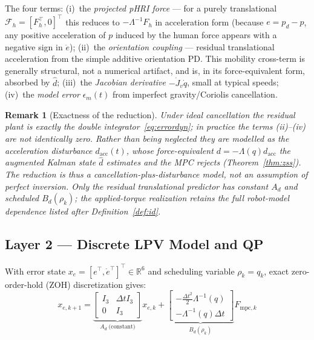\documentclass[journal]{IEEEtran}
\newtheorem{remark}{Remark}
\newcommand{\Laminv}{\Lambda^{-1}(q)}
\newcommand{\Fmpck}[1]{F_{\text{mpc},#1}}
\newcommand{\dhat}{\hat{d}}
\begin{document}
The four terms: (i)~the \emph{projected pHRI force} — for a purely
translational $\mathcal{F}_h=[F_h^\top,0]^\top$ this reduces to
$-\Lambda^{-1}F_h$ in acceleration form (because $e=p_d-p$, any positive
acceleration of $p$ induced by the human force appears with a negative sign
in $\ddot e$);
(ii)~the \emph{orientation coupling} — residual translational
acceleration from the simple additive orientation PD. This mobility
cross-term is generally structural, not a numerical artifact, and is,
in its force-equivalent form, absorbed by $\dhat$;
(iii)~the \emph{Jacobian derivative} $-\dot{J}_v\dot{q}$, small at
typical speeds; (iv)~the \emph{model error} $\epsilon_m(t)$ from
imperfect gravity/Coriolis cancellation.

\begin{remark}[Exactness of the reduction]
Under \emph{ideal} cancellation the residual plant is exactly the double
integrator~\eqref{eq:errordyn}; in practice the terms
(ii)--(iv) are not identically zero. Rather than being neglected they are
\emph{modelled} as the acceleration disturbance $d_{\text{acc}}(t)$, whose
force-equivalent $d=-\Lambda(q)d_{\text{acc}}$ the augmented Kalman state
$\dhat$ estimates and the MPC rejects (Theorem~\ref{thm:zss}). The reduction is
thus a \emph{cancellation-plus-disturbance} model, not an assumption of perfect
inversion. Only the residual translational predictor has constant $A_d$ and
scheduled $B_d(\rho_k)$; the applied-torque realization retains the full
robot-model dependence listed after Definition~\ref{def:id}.
\end{remark}

\subsection{Layer 2 --- Discrete LPV Model and QP}\label{sec:layer2}

With error state $x_e=[e^\top,\dot{e}^\top]^\top\in\mathbb{R}^6$ and
scheduling variable $\rho_k=q_k$, exact zero-order-hold (ZOH) discretization gives:
\begin{equation}\label{eq:lpv}
  x_{e,k+1} = \underbrace{\begin{bmatrix}I_3&\Delta t I_3\\0&I_3\end{bmatrix}}_{A_d\;\text{(constant)}}
              x_{e,k}
            + \underbrace{\begin{bmatrix}-\tfrac{\Delta t^2}{2}\Laminv\\-\Laminv\Delta t\end{bmatrix}}_{B_d(\rho_k)}
              \Fmpck{k}
\end{equation}
\end{document}
